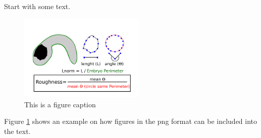 Start with some text.
\begin{figure}[h]
  \includegraphics[width=6cm]{./Images/Fig.png}
  \centering
  \caption{This is a figure caption}
  \label{fig:Fig}
\end{figure}


Figure \ref{fig:Fig} shows an example on how figures in the 
png format can be included into the text.\par